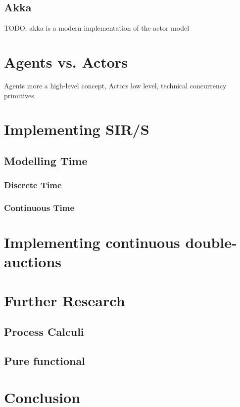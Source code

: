 \documentclass{article}
\begin{document}
\subsection{Akka}
TODO: akka is a modern implementation of the actor model

\section{Agents vs. Actors}
Agents more a high-level concept, Actors low level, technical concurrency primitives


\section{Implementing SIR/S}
\subsection{Modelling Time}
\subsubsection{Discrete Time}
\subsubsection{Continuous Time}


\section{Implementing continuous double-auctions}


\section{Further Research}
\subsection{Process Calculi}
\subsection{Pure functional}

\section{Conclusion}





\end{document}
